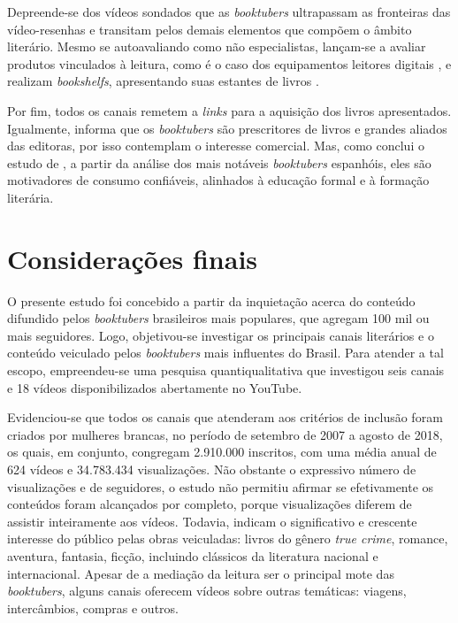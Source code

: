 \documentclass[portuguese]{textolivre}
\begin{document}
Depreende-se dos vídeos sondados que as \emph{booktubers} ultrapassam as
fronteiras das vídeo-resenhas e transitam pelos demais elementos que
compõem o âmbito literário. Mesmo se autoavaliando como não
especialistas, lançam-se a avaliar produtos vinculados à leitura, como é
o caso dos equipamentos leitores digitais \cite{feltrin2021}, %
e realizam \emph{bookshelfs}, apresentando suas estantes de livros \cite{souza2021}. 

Por fim, todos os canais remetem a \emph{links} para a aquisição dos
livros apresentados. Igualmente, \textcite{Tomasena2021} %
informa que os
\emph{booktubers} são prescritores de livros e grandes aliados das
editoras, por isso contemplam o interesse comercial. Mas, como conclui o
estudo de \textcite{GarcaRoca2020}, %
a partir da análise dos mais notáveis
\emph{booktubers} espanhóis, eles são motivadores de consumo confiáveis,
alinhados à educação formal e à formação literária.

\section{Considerações finais}\label{sec-con}
O presente estudo foi concebido a partir da inquietação acerca do
conteúdo difundido pelos \emph{booktubers} brasileiros mais populares,
que agregam 100 mil ou mais seguidores. Logo, objetivou-se investigar os
principais canais literários e o conteúdo veiculado pelos
\emph{booktubers} mais influentes do Brasil. Para atender a tal escopo,
empreendeu-se uma pesquisa quantiqualitativa que investigou seis canais
e 18 vídeos disponibilizados abertamente no YouTube.

Evidenciou-se que todos os canais que atenderam aos critérios de
inclusão foram criados por mulheres brancas, no período de setembro de
2007 a agosto de 2018, os quais, em conjunto, congregam 2.910.000
inscritos, com uma média anual de 624 vídeos e 34.783.434 visualizações.
Não obstante o expressivo número de visualizações e de seguidores, o
estudo não permitiu afirmar se efetivamente os conteúdos foram
alcançados por completo, porque visualizações diferem de assistir
inteiramente aos vídeos. Todavia, indicam o significativo e crescente
interesse do público pelas obras veiculadas: livros do gênero \emph{true
crime}, romance, aventura, fantasia, ficção, incluindo clássicos da
literatura nacional e internacional. Apesar de a mediação da leitura ser
o principal mote das \emph{booktubers}, alguns canais oferecem
vídeos sobre outras temáticas: viagens, intercâmbios, compras e outros.
\end{document}
